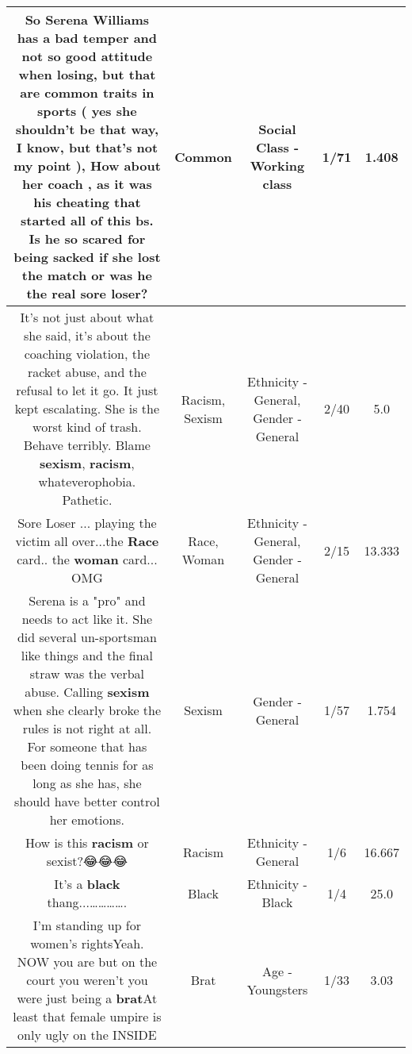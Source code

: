 \documentclass[11pt]{article}
\newlength\mylength
\begin{document}
\begin{center}
\begin{longtable}{|C{.65\mylength}|C{.30\mylength}|C{.12\mylength}|C{.12\mylength}|C{.12\mylength}|}
  \small So Serena Williams has a bad temper and not so good attitude when losing, but that are \textbf{common} traits in sports ( yes she shouldn't be that way, I know,  but that's not my point ), How about her coach , as it was his cheating that started all of this bs. Is he so scared for being sacked if she lost the match or was he the real sore loser?\normalsize   & Common & Social Class - Working class & 1/71 & 1.408 \\  \hline
  \small It's not just about what she said, it's about the coaching violation, the racket abuse, and the refusal to let it go. It just kept escalating. She is the worst kind of trash. Behave terribly. Blame \textbf{sexism}, \textbf{racism}, whateverophobia. Pathetic.\normalsize   & Racism, Sexism & Ethnicity - General, Gender - General & 2/40 & 5.0 \\  \hline
  \small Sore Loser ... playing the victim all over...the \textbf{Race} card.. the \textbf{woman} card... OMG\normalsize   & Race, Woman & Ethnicity - General, Gender - General & 2/15 & 13.333 \\  \hline
  \small Serena is a "pro" and needs to act like it. She did several un-sportsman like things and the final straw was the verbal abuse. Calling \textbf{sexism} when she clearly broke the rules is not right at all. For someone that has been doing tennis for as long as she has, she should have better control her emotions.\normalsize   & Sexism & Gender - General & 1/57 & 1.754 \\  \hline
  \small How is this \textbf{racism} or sexist?😂😂😂\normalsize   & Racism & Ethnicity - General & 1/6 & 16.667 \\  \hline
  \small It's a \textbf{black} thang...………….\normalsize   & Black & Ethnicity - Black & 1/4 & 25.0 \\  \hline
  \small I'm standing up for women's rightsYeah. NOW you are but on the court you weren't you were just being a \textbf{brat}At least that female umpire is only ugly on the INSIDE\normalsize   & Brat & Age - Youngsters & 1/33 & 3.03 \\  \hline

\end{longtable}
\end{center}
\end{document}
